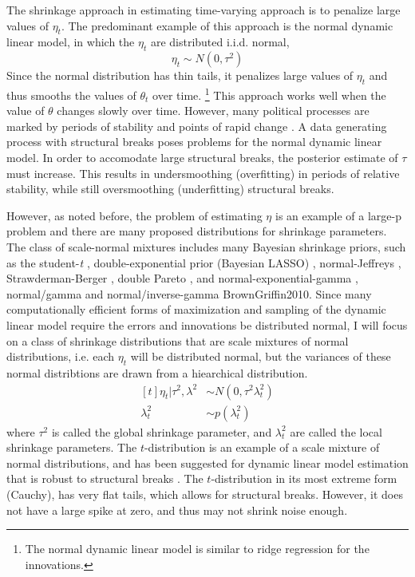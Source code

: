 \documentclass{article}
\begin{document}
The shrinkage approach in estimating time-varying approach is to penalize large values of $\eta_{t}$. 
The predominant example of this approach is the normal dynamic linear model, in which the $\eta_{t}$ are distributed i.i.d. normal,
\begin{equation}
  \label{eq:4}
  \eta_{t} \sim N(0, \tau^{2})
\end{equation}
Since the normal distribution has thin tails, it penalizes large values of $\eta_{t}$ and thus smooths the values of $\theta_{t}$ over time.
\footnote{The normal dynamic linear model is similar to ridge regression for the innovations.}
This approach works well when the value of $\theta$ changes slowly over time.
However, many political processes are marked by periods of stability and points of rapid change \parencite{RatkovicEng2010}.
A data generating process with structural breaks poses problems for the normal dynamic linear model.
In order to accomodate large structural breaks, the posterior estimate of $\tau$ must increase. 
This results in undersmoothing (overfitting) in periods of relative stability, while still oversmoothing (underfitting) structural breaks.

However, as noted before, the problem of estimating $\eta$ is an example of a large-p problem and there are many proposed distributions for shrinkage parameters.
The class of scale-normal mixtures includes many Bayesian shrinkage priors, such as the student-\textit{t} \parencite{Tipping2001}, double-exponential prior (Bayesian LASSO) \parencites{LiGoel2006}{ParkCasella2008}{Hans2009}, normal-Jeffreys \parencites{FigueiredoMember2003}{BaeMallick2004}, Strawderman-Berger \parencites{Strawderman1971}{Berger1980}, double Pareto \parencite{ArmaganDunsonLee2011},  and normal-exponential-gamma \parencite{BrownGriffin2005}, normal/gamma and normal/inverse-gamma \parencite{CaronDoucet2008}{BrownGriffin2010}.
Since many computationally efficient forms of maximization and sampling of the dynamic linear model require the errors and innovations be distributed normal, I will focus on a class of shrinkage distributions that are scale mixtures of normal distributions, i.e. each $\eta_{t}$ will be distributed normal, but the variances of these normal distribtions are drawn from a hiearchical distribution.
\begin{equation}
  \label{eq:6}
  \begin{aligned}[t]
    \eta_{t} | \tau^{2}, \lambda^{2} & \sim N(0, \tau^{2} \lambda_{t}^{2}) \\
    \lambda_{t}^{2} & \sim p(\lambda^{2}_{t})
  \end{aligned}
\end{equation}
where $\tau^{2}$ is called the global shrinkage parameter, and $\lambda_{t}^{2}$ are called the local shrinkage parameters.
The $t$-distribution is an example of a scale mixture of normal distributions, and has been suggested for dynamic linear model estimation that is robust to structural breaks \parencites{HarveyKoopman2000}{PetrisPetroneEtAl2009}.
The $t$-distribution in its most extreme form (Cauchy), has very flat tails, which allows for structural breaks.
However, it does not have a large spike at zero, and thus may not shrink noise enough.
\end{document}
